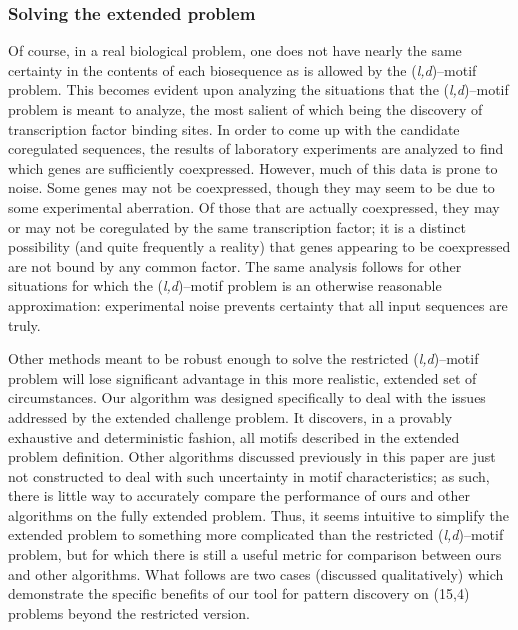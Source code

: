 \subsubsection{Solving the extended problem}
    Of course, in a real biological problem, one does not have nearly the
    same certainty in the contents of each biosequence as is allowed by the
    (\textit{l,d})--motif problem.  This becomes evident upon analyzing the situations
    that the (\textit{l,d})--motif problem is meant to analyze, the most salient of which
    being the discovery of transcription factor binding sites.  In order to
    come up with the candidate coregulated sequences, the results of
    laboratory experiments are analyzed to find which genes are sufficiently
    coexpressed.  However, much of this data is prone to noise.
    Some genes may not be coexpressed, though they may seem to be
    due to some experimental aberration.  Of those that are actually
    coexpressed, they may or may not be coregulated by the same transcription
    factor; it is a distinct possibility (and quite frequently a reality)
    that genes appearing to be coexpressed are not bound by any common
    factor.  The same analysis follows for other situations for which the
    (\textit{l,d})--motif problem is an otherwise reasonable approximation: experimental
    noise prevents certainty that all input sequences are truly.

    Other methods meant to be robust enough to solve
    the restricted (\textit{l,d})--motif problem will lose significant
    advantage in this more realistic, extended set of circumstances.
    Our algorithm was designed specifically to deal with the issues addressed by the
    extended challenge problem.  It discovers, in a provably exhaustive and
    deterministic fashion, all motifs described in the
    extended problem definition.  Other algorithms discussed
    previously in this paper are just not constructed to deal with such
    uncertainty in motif characteristics; as such, there is little way to
    accurately compare the performance of ours and other algorithms on the
    fully extended problem.
    Thus, it seems intuitive to simplify the extended problem to
    something more complicated than the restricted (\textit{l,d})--motif problem,
    but for which there is still a useful metric for comparison between ours and
    other algorithms.
    What follows are two cases (discussed qualitatively)
    which demonstrate
    the specific benefits of our tool for pattern discovery on (15,4) problems
    beyond the restricted version.

